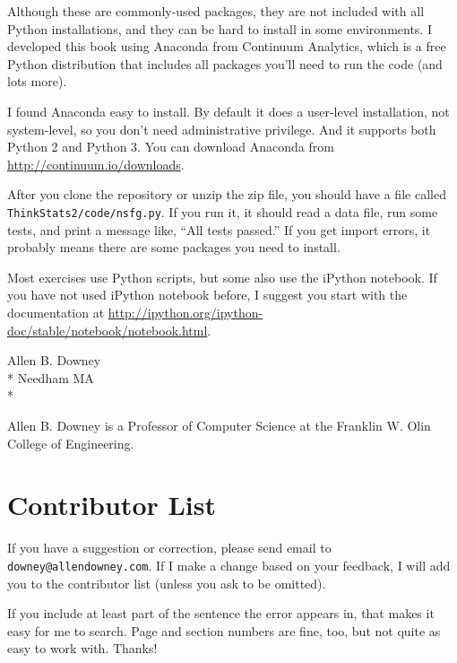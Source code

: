 \documentclass[12pt]{book}
\begin{document}
Although these are commonly-used packages, they are not included with
all Python installations, and they can be hard to install in some
environments.  I developed this book using Anaconda from Continuum
Analytics, which is a free Python distribution that includes all
packages you'll need to run the code (and lots more).

I found Anaconda easy to install.  By default it does a user-level
installation, not system-level, so you don't need administrative
privilege.  And it supports both Python 2 and Python 3.  You can
download Anaconda from \url{http://continuum.io/downloads}.

After you clone the repository or unzip the zip file, you should
have a file called {\tt ThinkStats2/code/nsfg.py}.  If you run it,
it should read a data file, run some tests, and print a message
like, ``All tests passed.''  If you get import errors, it probably
means there are some packages you need to install.

Most exercises use Python scripts, but some also use the iPython
notebook.  If you have not used iPython notebook before, I suggest
you start with the documentation at
\url{http://ipython.org/ipython-doc/stable/notebook/notebook.html}.


Allen B. Downey \\*
Needham MA \\*

Allen B. Downey is a Professor of Computer Science at 
the Franklin W. Olin College of Engineering.







\section*{Contributor List}

If you have a suggestion or correction, please send email to 
{\tt downey@allendowney.com}.  If I make a change based on your
feedback, I will add you to the contributor list
(unless you ask to be omitted).

If you include at least part of the sentence the
error appears in, that makes it easy for me to search.  Page and
section numbers are fine, too, but not quite as easy to work with.
Thanks!
\end{document}
